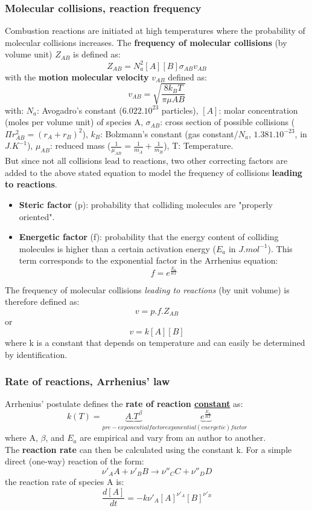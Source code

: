 \documentclass[a4paper,11pt]{article}
\begin{document}
\subsubsection{Molecular collisions, reaction frequency}
Combustion reactions are initiated at high temperatures where the probability of molecular collisions increases. The \textbf{frequency of molecular collisions} (by volume unit) $Z_{AB}$ is defined as:
\[Z_{AB} = N_a^2 [A] [B] \sigma_{AB} v_{AB}\]
with the \textbf{motion molecular velocity} $v_{AB}$ defined as:
\[v_{AB}=\sqrt{\frac{8k_B T}{\pi \mu{AB}}}\]
with: $N_{a}$: Avogadro's constant ($6.022.10^23$ particles), $[A]$: molar concentration (moles per volume unit) of species A, $\sigma_{AB}$: cross section of possible collisions ($\Pi r_{AB}^2=(r_A+r_B)^2$), $k_B$: Bolzmann's constant (gas constant/$N_a$, $1.381.10^{-23}$, in $J.K^{-1}$), $\mu_{AB}$: reduced mass ($\frac{1}{\mu_{AB}}=\frac{1}{m_A}+\frac{1}{m_B}$), T: Temperature.\\
But since not all collisions lead to reactions, two other correcting factors are added to the above stated equation to model the frequency of collisions \textbf{leading to reactions}.
\begin{itemize}
\item \textbf{Steric factor} (p): probability that colliding molecules are "properly oriented".
\item \textbf{Energetic factor} (f): probability that the energy content of colliding molecules is higher than a certain activation energy ($E_a$ in $J.mol^{-1}$). This term corresponds to the exponential factor in the Arrhenius equation:
\[f=e^\frac{E_a}{RT}\]
\end{itemize}
The frequency of molecular collisions \emph{leading to reactions} (by unit volume) is therefore defined as:
\[v = p.f.Z_{AB}\]
or
\[v = k[A][B]\]
where k is a constant that depends on temperature and can easily be determined by identification.
\subsubsection{Rate of reactions, Arrhenius' law}
Arrhenius' postulate defines the \textbf{rate of reaction \underline{constant}} as:
\[k(T) = \underbrace{A.T^\beta}_{pre-exponential factor} \underbrace{e^\frac{E_a}{RT}}_{exponential (energetic) factor}\]
where A, $\beta$, and $E_a$ are empirical and vary from an author to another.\\
The \textbf{reaction rate} can then be calculated using the constant k. For a simple direct (one-way) reaction of the form:
\[\nu'_A A + \nu'_B B \rightarrow \nu''_C C + \nu''_D D\]
the reaction rate of species A is:
\[\frac{d[A]}{dt} = - k \nu'_A [A]^{\nu'_A} [B]^{\nu'_B}\]
\end{document}
